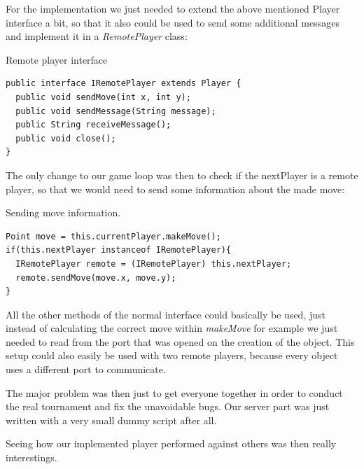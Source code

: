 \documentclass{scrartcl}
\begin{document}
For the implementation we just needed to extend the above mentioned Player interface a bit, so that it also could be used to send some additional messages and implement it in a \textit{RemotePlayer} class: 

\begin{listing}[H]
\caption{Remote player interface}
\begin{verbatim}
public interface IRemotePlayer extends Player {
  public void sendMove(int x, int y);
  public void sendMessage(String message);
  public String receiveMessage();
  public void close();
}
\end{verbatim}
\end{listing}

The only change to our game loop was then to check if the nextPlayer is a remote player, so that we would need to send some information about the made move:

\begin{listing}[H]
\caption{Sending move information.}
\begin{verbatim}
Point move = this.currentPlayer.makeMove();
if(this.nextPlayer instanceof IRemotePlayer){
  IRemotePlayer remote = (IRemotePlayer) this.nextPlayer;
  remote.sendMove(move.x, move.y);
}
\end{verbatim}
\end{listing}

All the other methods of the normal interface could basically be used, just instead of calculating the correct move within \textit{makeMove} for example we just needed to read from the port that was opened on the creation of the object. This setup could also easily be used with two remote players, because every object uses a different port to communicate.

The major problem was then just to get everyone together in order to conduct the real tournament and fix the unavoidable bugs. Our server part was just written with a very small dummy script after all.

Seeing how our implemented player performed against others was then really interestings.
\end{document}
